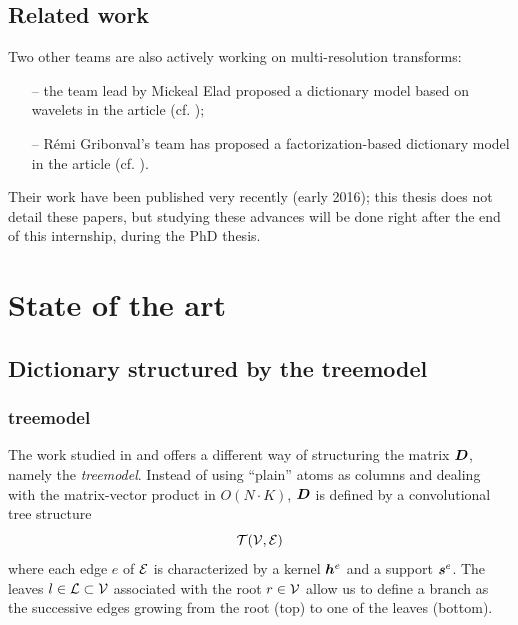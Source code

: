 \section{Related work}
Two other teams are also actively working on multi-resolution transforms:
\begin{itemize}
	\item[--] the team lead by Mickeal Elad proposed a dictionary model based on wavelets in the article  (cf. \cite{sulam_trainlets:_2016});
	\item[--] Rémi Gribonval’s team has proposed a factorization-based dictionary model in the article  (cf. \cite{magoarou_flexible_2016}).
\end{itemize}
Their work have been published very recently (early 2016); this thesis does not detail these papers, but studying these advances will be done right after the end of this internship, during the PhD thesis.

\chapter{State of the art}

\section{Dictionary structured by the \Gls{treemodel}}

\subsection{\Gls{treemodel}}\label{sec_tree_model}
The work studied in \cite{chabiron_toward_2015} and \cite{chabiron_optimization_2016} offers a different way of structuring the matrix $\bm{D}$, namely the \emph{\Gls{treemodel}}. Instead of using “plain” atoms as columns and dealing with the matrix-vector product in $O(N \cdot K)$, $\bm{D}$ is defined by a convolutional tree structure $$\mathcal T(\mathcal V,\mathcal E)$$ where each edge $e$ of $\mathcal E$ is characterized by a kernel $\bm{h}^e$ and a support $\bm{s}^e$. The leaves $l \in \mathcal L \subset \mathcal V$ associated with the root $r \in \mathcal V$ allow us to define a branch as the successive edges growing from the root (top) to one of the leaves (bottom).

